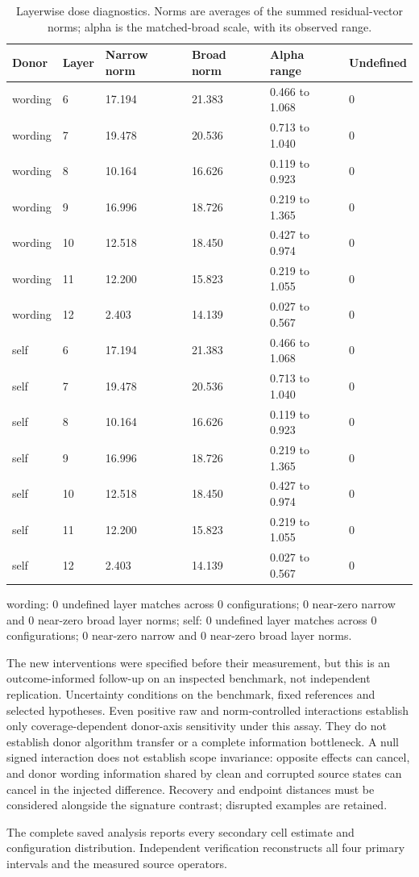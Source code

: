 \begin{table}[htbp]
\centering\footnotesize
\setlength{\tabcolsep}{3pt}
\caption{Layerwise dose diagnostics. Norms are averages of the summed residual-vector norms; alpha is the matched-broad scale, with its observed range.}
\label{tab:b008-doses}
\begin{tabular}{@{}llllll@{}}
\toprule
Donor & Layer & Narrow norm & Broad norm & Alpha range & Undefined \\
\midrule
wording & 6 & 17.194 & 21.383 & 0.466 to 1.068 & 0 \\
wording & 7 & 19.478 & 20.536 & 0.713 to 1.040 & 0 \\
wording & 8 & 10.164 & 16.626 & 0.119 to 0.923 & 0 \\
wording & 9 & 16.996 & 18.726 & 0.219 to 1.365 & 0 \\
wording & 10 & 12.518 & 18.450 & 0.427 to 0.974 & 0 \\
wording & 11 & 12.200 & 15.823 & 0.219 to 1.055 & 0 \\
wording & 12 & 2.403 & 14.139 & 0.027 to 0.567 & 0 \\
self & 6 & 17.194 & 21.383 & 0.466 to 1.068 & 0 \\
self & 7 & 19.478 & 20.536 & 0.713 to 1.040 & 0 \\
self & 8 & 10.164 & 16.626 & 0.119 to 0.923 & 0 \\
self & 9 & 16.996 & 18.726 & 0.219 to 1.365 & 0 \\
self & 10 & 12.518 & 18.450 & 0.427 to 0.974 & 0 \\
self & 11 & 12.200 & 15.823 & 0.219 to 1.055 & 0 \\
self & 12 & 2.403 & 14.139 & 0.027 to 0.567 & 0 \\
\bottomrule
\end{tabular}
\end{table}

wording: 0 undefined layer matches across 0 configurations; 0 near-zero narrow and 0 near-zero broad layer norms; self: 0 undefined layer matches across 0 configurations; 0 near-zero narrow and 0 near-zero broad layer norms.

The new interventions were specified before their measurement, but this is an outcome-informed follow-up on an inspected benchmark, not independent replication. Uncertainty conditions on the benchmark, fixed references and selected hypotheses. Even positive raw and norm-controlled interactions establish only coverage-dependent donor-axis sensitivity under this assay. They do not establish donor algorithm transfer or a complete information bottleneck. A null signed interaction does not establish scope invariance: opposite effects can cancel, and donor wording information shared by clean and corrupted source states can cancel in the injected difference. Recovery and endpoint distances must be considered alongside the signature contrast; disrupted examples are retained.

The complete saved analysis reports every secondary cell estimate and configuration distribution. Independent verification reconstructs all four primary intervals and the measured source operators.
